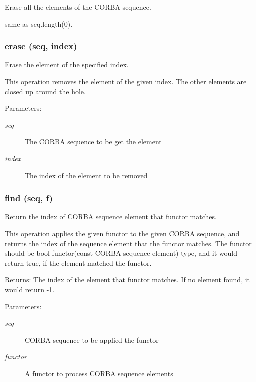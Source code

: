 Erase all the elements of the CORBA sequence. 

same as seq.length(0).
\subsubsection{\setlength{\rightskip}{0pt plus 5cm}erase (seq, index)}\label{CORBA__SeqEx_8py_a6}


Erase the element of the specified index. 

This operation removes the element of the given index. The other elements are closed up around the hole.

\begin{Desc}
\item[Parameters:]
\begin{description}
\item[{\em seq}]The CORBA sequence to be get the element \item[{\em index}]The index of the element to be removed\end{description}
\end{Desc}
\subsubsection{\setlength{\rightskip}{0pt plus 5cm}find (seq, f)}\label{CORBA__SeqEx_8py_a1}


Return the index of CORBA sequence element that functor matches. 

This operation applies the given functor to the given CORBA sequence, and returns the index of the sequence element that the functor matches. The functor should be bool functor(const CORBA sequence element) type, and it would return true, if the element matched the functor.

\begin{Desc}
\item[Returns:]The index of the element that functor matches. If no element found, it would return -1. \end{Desc}
\begin{Desc}
\item[Parameters:]
\begin{description}
\item[{\em seq}]CORBA sequence to be applied the functor \item[{\em functor}]A functor to process CORBA sequence elements\end{description}
\end{Desc}

